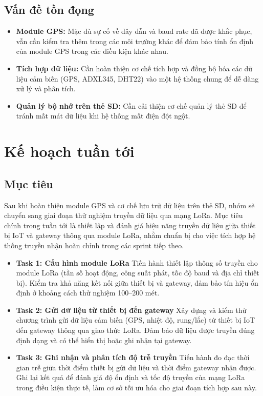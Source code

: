\subsection*{Vấn đề tồn đọng}  
\begin{itemize}
    \item \textbf{Module GPS:} Mặc dù sự cố về dây dẫn và baud rate đã được khắc phục, vẫn cần kiểm tra thêm trong các môi trường khác để đảm bảo tính ổn định của module GPS trong các điều kiện khác nhau.
    \item \textbf{Tích hợp dữ liệu:} Cần hoàn thiện cơ chế tích hợp và đồng bộ hóa các dữ liệu cảm biến (GPS, ADXL345, DHT22) vào một hệ thống chung để dễ dàng xử lý và phân tích.
    \item \textbf{Quản lý bộ nhớ trên thẻ SD:} Cần cải thiện cơ chế quản lý thẻ SD để tránh mất mát dữ liệu khi hệ thống mất điện đột ngột.
\end{itemize}
\section{Kế hoạch tuần tới}

\subsection*{Mục tiêu}
Sau khi hoàn thiện module GPS và cơ chế lưu trữ dữ liệu trên thẻ SD, nhóm sẽ chuyển sang giai đoạn thử nghiệm truyền dữ liệu qua mạng LoRa. Mục tiêu chính trong tuần tới là thiết lập và đánh giá hiệu năng truyền dữ liệu giữa thiết bị IoT và gateway thông qua module LoRa, nhằm chuẩn bị cho việc tích hợp hệ thống truyền nhận hoàn chỉnh trong các sprint tiếp theo.

\begin{itemize}
    \item \textbf{Task 1: Cấu hình module LoRa}  
    Tiến hành thiết lập thông số truyền cho module LoRa (tần số hoạt động, công suất phát, tốc độ baud và địa chỉ thiết bị). Kiểm tra khả năng kết nối giữa thiết bị và gateway, đảm bảo tín hiệu ổn định ở khoảng cách thử nghiệm 100–200 mét.

    \item \textbf{Task 2: Gửi dữ liệu từ thiết bị đến gateway}  
    Xây dựng và kiểm thử chương trình gửi dữ liệu cảm biến (GPS, nhiệt độ, rung/lắc) từ thiết bị IoT đến gateway thông qua giao thức LoRa. Đảm bảo dữ liệu được truyền đúng định dạng và có thể hiển thị hoặc ghi nhận tại gateway.

    \item \textbf{Task 3: Ghi nhận và phân tích độ trễ truyền}  
    Tiến hành đo đạc thời gian trễ giữa thời điểm thiết bị gửi dữ liệu và thời điểm gateway nhận được. Ghi lại kết quả để đánh giá độ ổn định và tốc độ truyền của mạng LoRa trong điều kiện thực tế, làm cơ sở tối ưu hóa cho giai đoạn tích hợp sau này.
\end{itemize}